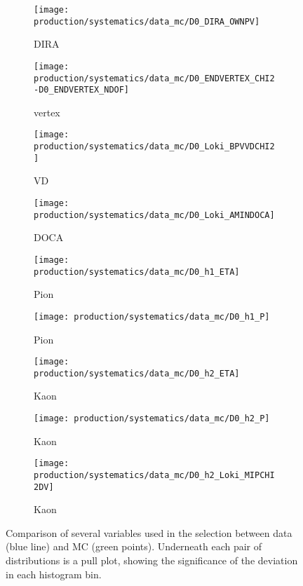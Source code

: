 \begin{figure}
  \begin{subfigure}{0.3\textwidth}
    \centering
    \texttt{[image: production/systematics/data\_mc/D0\_DIRA\_OWNPV]}
    \caption{\PDzero \ac{DIRA}}
  \end{subfigure}
  \begin{subfigure}{0.3\textwidth}
    \centering
    \texttt{[image: production/systematics/data\_mc/D0\_ENDVERTEX\_CHI2-D0\_ENDVERTEX\_NDOF]}
    \caption{\PDzero vertex \chisq}
  \end{subfigure}
  \begin{subfigure}{0.3\textwidth}
    \centering
    \texttt{[image: production/systematics/data\_mc/D0\_Loki\_BPVVDCHI2]}
    \caption{\PDzero VD \chisq}
  \end{subfigure}

  \begin{subfigure}{0.3\textwidth}
    \centering
    \texttt{[image: production/systematics/data\_mc/D0\_Loki\_AMINDOCA]}
    \caption{\PDzero \ac{DOCA}}
  \end{subfigure}
  \begin{subfigure}{0.3\textwidth}
    \centering
    \texttt{[image: production/systematics/data\_mc/D0\_h1\_ETA]}
    \caption{Pion \Eta}
  \end{subfigure}
  \begin{subfigure}{0.3\textwidth}
    \centering
    \texttt{[image: production/systematics/data\_mc/D0\_h1\_P]}
    \caption{Pion \ptot}
  \end{subfigure}

  \begin{subfigure}{0.3\textwidth}
    \centering
    \texttt{[image: production/systematics/data\_mc/D0\_h2\_ETA]}
    \caption{Kaon \Eta}
  \end{subfigure}
  \begin{subfigure}{0.3\textwidth}
    \centering
    \texttt{[image: production/systematics/data\_mc/D0\_h2\_P]}
    \caption{Kaon \ptot}
  \end{subfigure}
  \begin{subfigure}{0.3\textwidth}
    \centering
    \texttt{[image: production/systematics/data\_mc/D0\_h2\_Loki\_MIPCHI2DV]}
    \caption{Kaon \ipchisq}
  \end{subfigure}

  \caption{%
    Comparison of several variables used in the \DzToKpi selection between data 
    (blue line) and \ac{MC} (green points).
    Underneath each pair of distributions is a pull plot, showing the 
    significance of the deviation in each histogram bin.
  }
  \label{fig:prod:syst:mc:D0ToKpi}
\end{figure}

